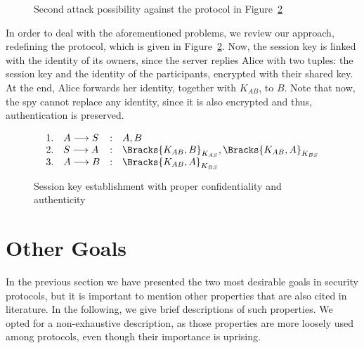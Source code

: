 \begin{figure}[ht]\label{fig:auth-attack2}
  \centering

  \caption{Second attack possibility against the protocol in Figure~\ref{prt:session-key-auth}}
\end{figure}

In order to deal with the aforementioned problems, we review our approach, redefining the protocol, which is given in Figure~\ref{prt:session-key-auth}. Now, the session key is linked with the identity of its owners, since the server replies Alice with two tuples: the session key and the identity of the participants, encrypted with their shared key. At the end, Alice forwards her identity, together with \(K_{AB}\), to \(B\). Note that now, the spy cannot replace any identity, since it is also encrypted and thus, authentication is preserved.

\begin{figure}[ht]\label{prt:session-key-auth}
  \centering
  \[
    \begin{array}{rlcl}
      1. & A \longrightarrow S &:& A, B \\
      2. & S \longrightarrow A &:& \Bracks{K_{AB}, B}_{K_{AS}}, \Bracks{K_{AB}, A}_{K_{BS}} \\
      3. & A \longrightarrow B &:& \Bracks{K_{AB}, A}_{K_{BS}} \\
    \end{array}
  \]
  \caption{Session key establishment with proper confidentiality and authenticity}
\end{figure}





\section{Other Goals}
In the previous section we have presented the two most desirable goals in security protocols, but it is important to mention other properties that are also cited in literature. In the following, we give brief descriptions of such properties. We opted for a non-exhaustive description, as those properties are more loosely used among protocols, even though their importance is uprising.


